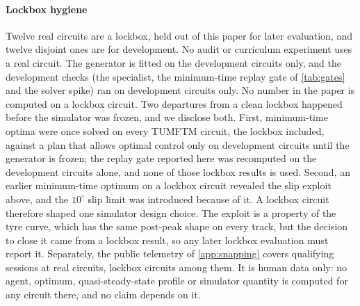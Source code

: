 \paragraph{Lockbox hygiene} Twelve real circuits are a lockbox, held out of this paper
for later evaluation, and twelve disjoint ones are for development. No audit or
curriculum experiment uses a real circuit. The generator is fitted on the development
circuits only, and the development checks (the specialist, the minimum-time replay gate
of \cref{tab:gates} and the solver spike) ran on development circuits only. No number in
the paper is computed on a lockbox circuit. Two departures from a clean lockbox happened
before the simulator was frozen, and we disclose both. First, minimum-time optima were
once solved on every TUMFTM circuit, the lockbox included, against a plan that allows
optimal control only on development circuits until the generator is frozen; the replay
gate reported here was recomputed on the development circuits alone, and none of those
lockbox results is used. Second, an earlier minimum-time optimum on a lockbox circuit
revealed the slip exploit above, and the $10^\circ$ slip limit was introduced because of
it. A lockbox circuit therefore shaped one simulator design choice. The exploit is a
property of the tyre curve, which has the same post-peak shape on every track, but the
decision to close it came from a lockbox result, so any later lockbox evaluation must
report it.
Separately, the public telemetry of \cref{app:snapping} covers qualifying sessions at
real circuits, lockbox circuits among them. It is human data only: no agent, optimum,
quasi-steady-state profile or simulator quantity is computed for any circuit there, and
no claim depends on it.
